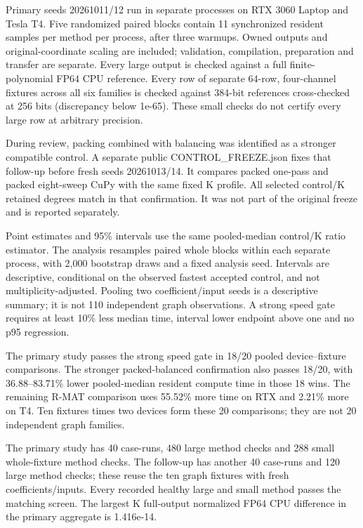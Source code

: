 \documentclass[10pt]{article}
\begin{document}
Primary seeds 20261011/12 run in separate processes on RTX 3060 Laptop and Tesla T4. Five randomized paired blocks contain 11 synchronized resident samples per method per process, after three warmups. Owned outputs and original-coordinate scaling are included; validation, compilation, preparation and transfer are separate. Every large output is checked against a full finite-polynomial FP64 CPU reference. Every row of separate 64-row, four-channel fixtures across all six families is checked against 384-bit references cross-checked at 256 bits (discrepancy below 1e-65). These small checks do not certify every large row at arbitrary precision.

During review, packing combined with balancing was identified as a stronger compatible control. A separate public CONTROL\_FREEZE.json fixes that follow-up before fresh seeds 20261013/14. It compares packed one-pass and packed eight-sweep CuPy with the same fixed K profile. All selected control/K retained degrees match in that confirmation. It was not part of the original freeze and is reported separately.

Point estimates and 95\% intervals use the same pooled-median control/K ratio estimator. The analysis resamples paired whole blocks within each separate process, with 2,000 bootstrap draws and a fixed analysis seed. Intervals are descriptive, conditional on the observed fastest accepted control, and not multiplicity-adjusted. Pooling two coefficient/input seeds is a descriptive summary; it is not 110 independent graph observations. A strong speed gate requires at least 10\% less median time, interval lower endpoint above one and no p95 regression.

The primary study passes the strong speed gate in 18/20 pooled device--fixture comparisons. The stronger packed-balanced confirmation also passes 18/20, with 36.88--83.71\% lower pooled-median resident compute time in those 18 wins. The remaining R-MAT comparison uses 55.52\% more time on RTX and 2.21\% more on T4. Ten fixtures times two devices form these 20 comparisons; they are not 20 independent graph families.

The primary study has 40 case-runs, 480 large method checks and 288 small whole-fixture method checks. The follow-up has another 40 case-runs and 120 large method checks; these reuse the ten graph fixtures with fresh coefficients/inputs. Every recorded healthy large and small method passes the matching screen. The largest K full-output normalized FP64 CPU difference in the primary aggregate is 1.416e-14.
\end{document}
